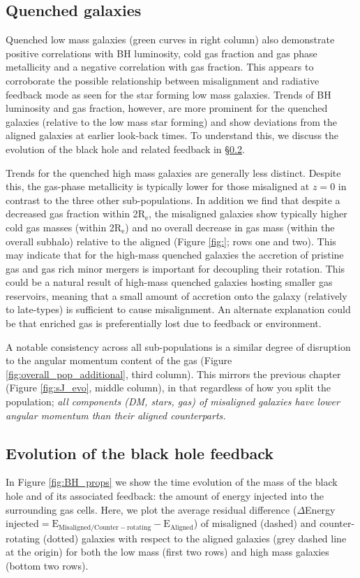 \subsection{Quenched galaxies}
Quenched low mass galaxies (green curves in right column) also demonstrate positive correlations with BH luminosity, cold gas fraction and gas phase metallicity and a negative correlation with gas fraction. This appears to corroborate the possible relationship between misalignment and radiative feedback mode as seen for the star forming low mass galaxies. Trends of BH luminosity and gas fraction, however, are more prominent for the quenched galaxies (relative to the low mass star forming) and show deviations from the aligned galaxies at earlier look-back times. To understand this, we discuss the evolution of the black hole and related feedback in \S\ref{sec:evolution}.
 
Trends for the quenched high mass galaxies are generally less distinct. Despite this, the gas-phase metallicity is typically lower for those misaligned at $z=0$ in contrast to the three other sub-populations. In addition we find that despite a decreased gas fraction within 2$\mathrm{R_{e}}$, the misaligned galaxies show typically higher cold gas masses (within 2$\mathrm{R_{e}}$) and no overall decrease in gas mass (within the overall subhalo) relative to the aligned (Figure \ref{fig:}; rows one and two). This may indicate that for the high-mass quenched galaxies the accretion of pristine gas and gas rich minor mergers is important for decoupling their rotation. This could be a natural result of high-mass quenched galaxies hosting smaller gas reservoirs, meaning that a small amount of accretion onto the galaxy (relatively to late-types) is sufficient to cause misalignment. An alternate explanation could be that enriched gas is preferentially lost due to feedback or environment. 

A notable consistency across all sub-populations is a similar degree of disruption to the angular momentum content of the gas (Figure \ref{fig:overall_pop_additional}, third column). This mirrors the previous chapter (Figure \ref{fig:sJ_evo}, middle column), in that regardless of how you split the population; \textit{all components (DM, stars, gas) of misaligned galaxies have lower angular momentum than their aligned counterparts.}

\subsection{Evolution of the black hole feedback} \label{sec:evolution}
In Figure \ref{fig:BH_props} we show the time evolution of the mass of the black hole and of its associated feedback: the amount of energy injected into the surrounding gas cells. Here, we plot the average residual difference ($\Delta$Energy injected$\mathrm{ = E_{Misaligned/Counter-rotating} - E_{Aligned}}$) of misaligned (dashed) and counter-rotating (dotted) galaxies with respect to the aligned galaxies (grey dashed line at the origin) for both the low mass (first two rows) and high mass galaxies (bottom two rows).

